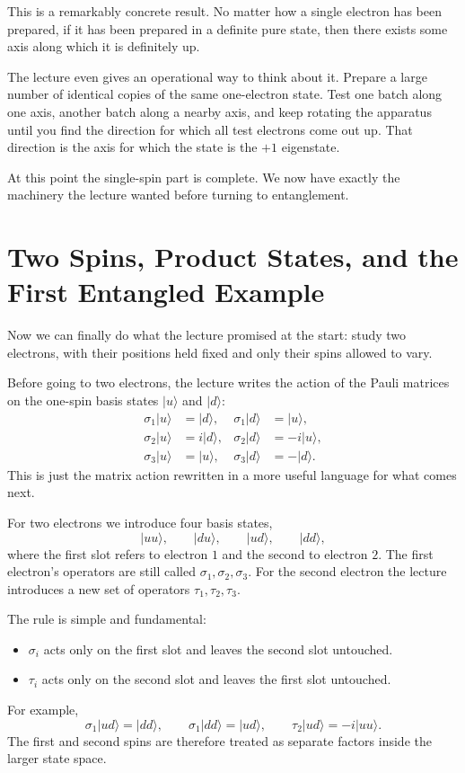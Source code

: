 This is a remarkably concrete result. No matter how a single electron has been prepared, if it has been prepared in a definite pure state, then there exists some axis along which it is definitely up.

The lecture even gives an operational way to think about it. Prepare a large number of identical copies of the same one-electron state. Test one batch along one axis, another batch along a nearby axis, and keep rotating the apparatus until you find the direction for which all test electrons come out up. That direction is the axis for which the state is the \(+1\) eigenstate.

At this point the single-spin part is complete. We now have exactly the machinery the lecture wanted before turning to entanglement.

\section{Two Spins, Product States, and the First Entangled Example}

Now we can finally do what the lecture promised at the start: study two electrons, with their positions held fixed and only their spins allowed to vary.

Before going to two electrons, the lecture writes the action of the Pauli matrices on the one-spin basis states \(|u\rangle\) and \(|d\rangle\):
\begin{align}
\sigma_1|u\rangle &= |d\rangle, &
\sigma_1|d\rangle &= |u\rangle, \\
\sigma_2|u\rangle &= i|d\rangle, &
\sigma_2|d\rangle &= -i|u\rangle, \\
\sigma_3|u\rangle &= |u\rangle, &
\sigma_3|d\rangle &= -|d\rangle.
\end{align}
This is just the matrix action rewritten in a more useful language for what comes next.

For two electrons we introduce four basis states,
\begin{equation}
|uu\rangle,\qquad |du\rangle,\qquad |ud\rangle,\qquad |dd\rangle,
\end{equation}
where the first slot refers to electron \(1\) and the second to electron \(2\). The first electron's operators are still called \(\sigma_1,\sigma_2,\sigma_3\). For the second electron the lecture introduces a new set of operators \(\tau_1,\tau_2,\tau_3\).

The rule is simple and fundamental:
\begin{itemize}
\item \(\sigma_i\) acts only on the first slot and leaves the second slot untouched.
\item \(\tau_i\) acts only on the second slot and leaves the first slot untouched.
\end{itemize}
For example,
\begin{equation}
\sigma_1|ud\rangle=|dd\rangle,
\qquad
\sigma_1|dd\rangle=|ud\rangle,
\qquad
\tau_2|ud\rangle=-i|uu\rangle.
\end{equation}
The first and second spins are therefore treated as separate factors inside the larger state space.

